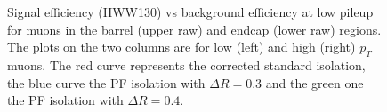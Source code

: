 \begin{figure}[!htbp]
\begin{center}
\caption{Signal efficiency (HWW130) vs background efficiency at low pileup
for muons in the barrel (upper raw) and endcap (lower raw) regions. The plots on the two columns
are for low (left) and high (right) $p_T$ muons. 
The red curve represents the corrected standard isolation, the blue curve the PF isolation with $\Delta R=0.3$
and the green one the PF isolation with $\Delta R=0.4$.}
\label{fig:IsoPerformance_Muon_LowPU}
\end{center}
\end{figure}


